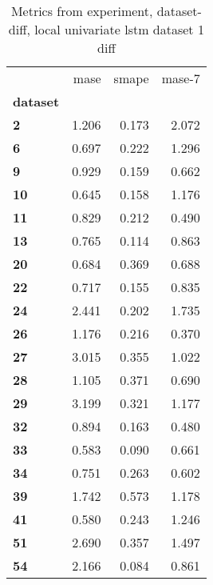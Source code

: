 \begin{table}[h]
\centering
\caption{Metrics from experiment, dataset-diff, local univariate lstm dataset 1 diff}
\label{table:local-univariate-lstm-dataset-1-diff-dataset-diff}
\begin{tabular}{lrrr}
\toprule
{} &   mase &  smape &  mase-7 \\
\textbf{dataset} &        &        &         \\
\midrule
\textbf{2      } &  1.206 &  0.173 &   2.072 \\
\textbf{6      } &  0.697 &  0.222 &   1.296 \\
\textbf{9      } &  0.929 &  0.159 &   0.662 \\
\textbf{10     } &  0.645 &  0.158 &   1.176 \\
\textbf{11     } &  0.829 &  0.212 &   0.490 \\
\textbf{13     } &  0.765 &  0.114 &   0.863 \\
\textbf{20     } &  0.684 &  0.369 &   0.688 \\
\textbf{22     } &  0.717 &  0.155 &   0.835 \\
\textbf{24     } &  2.441 &  0.202 &   1.735 \\
\textbf{26     } &  1.176 &  0.216 &   0.370 \\
\textbf{27     } &  3.015 &  0.355 &   1.022 \\
\textbf{28     } &  1.105 &  0.371 &   0.690 \\
\textbf{29     } &  3.199 &  0.321 &   1.177 \\
\textbf{32     } &  0.894 &  0.163 &   0.480 \\
\textbf{33     } &  0.583 &  0.090 &   0.661 \\
\textbf{34     } &  0.751 &  0.263 &   0.602 \\
\textbf{39     } &  1.742 &  0.573 &   1.178 \\
\textbf{41     } &  0.580 &  0.243 &   1.246 \\
\textbf{51     } &  2.690 &  0.357 &   1.497 \\
\textbf{54     } &  2.166 &  0.084 &   0.861 \\
\bottomrule
\end{tabular}
\end{table}
